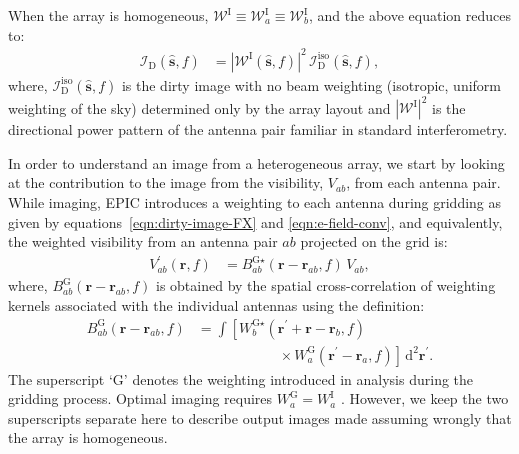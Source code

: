 \documentclass[a4paper,fleqn,usenatbib]{mnras}
\newcommand{\dif}{\mathrm{d}}
\begin{document}
When the array is homogeneous, $\mathcal{W}^\textrm{I} \equiv \mathcal{W}^\textrm{I}_a \equiv \mathcal{W}^\textrm{I}_b$, and the above equation reduces to:
\begin{align}\label{eqn:apndx-dirty-image-homogeneous}
  \mathcal{I}_\textrm{D}(\hat{\mathbf{s}},f) &= |\mathcal{W}^\textrm{I}(\hat{\mathbf{s}},f)|^2\,\mathcal{I}_\textrm{D}^\textrm{iso}(\hat{\mathbf{s}},f),
\end{align}
where, $\mathcal{I}_\textrm{D}^\textrm{iso}(\hat{\mathbf{s}},f)$ is the dirty image with no beam weighting (isotropic, uniform weighting of the sky) determined only by the array layout and $|\mathcal{W}^\textrm{I}|^2$ is the directional power pattern of the antenna pair familiar in standard interferometry.

In order to understand an image from a heterogeneous array, we start by looking at the contribution to the image from the visibility, $V_{ab}$, from each antenna pair. While imaging, EPIC introduces a weighting to each antenna during gridding as given by equations~\ref{eqn:dirty-image-FX} and \ref{eqn:e-field-conv}, and equivalently, the weighted visibility from an antenna pair $ab$ projected on the grid is:
\begin{align}
  V^\prime_{ab}(\mathbf{r},f) &= B^{\textrm{G}\star}_{ab}(\mathbf{r}-\mathbf{r}_{ab},f)\,V_{ab},
\end{align}
where, $B^\textrm{G}_{ab}(\mathbf{r}-\mathbf{r}_{ab},f)$ is obtained by the spatial cross-correlation of weighting kernels associated with the individual antennas using the definition:
\begin{align}
  B^\textrm{G}_{ab}(\mathbf{r}-\mathbf{r}_{ab},f) &= \int \left[ W^{\textrm{G}\star}_b(\mathbf{r}^\prime+\mathbf{r}-\mathbf{r}_b,f)\right. \nonumber\\
  &\qquad\qquad\qquad \left.\times\, W^\textrm{G}_a(\mathbf{r}^\prime-\mathbf{r}_a,f)\right]\,\dif^2\mathbf{r}^\prime.
\end{align}
The superscript `$\textrm{G}$' denotes the weighting introduced in analysis during the gridding process. Optimal imaging requires $W^\textrm{G}_a = W^\textrm{I}_a$ \citep{mor09,mor11}. However, we keep the two superscripts separate here to describe output images made assuming wrongly that the array is homogeneous.
\end{document}
